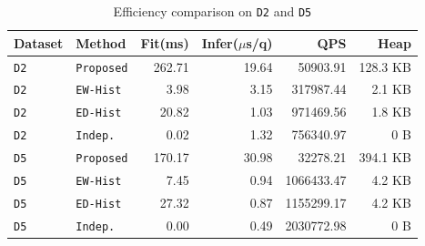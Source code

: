 \begin{table}[htbp]
    \centering
    \caption{Efficiency comparison on \texttt{D2} and \texttt{D5}}
    \label{tab:efficiency_comparison}
    \small
    \setlength{\tabcolsep}{3pt}
    \begin{tabular}{@{}llrrrr@{}}
        \toprule
        Dataset & Method & Fit(ms) & Infer($\mu$s/q) & QPS & Heap \\
        \midrule
        \texttt{D2} & \texttt{Proposed} & 262.71 & 19.64 & 50903.91 & 128.3 KB \\
        \texttt{D2} & \texttt{EW-Hist} & 3.98 & 3.15 & 317987.44 & 2.1 KB \\
        \texttt{D2} & \texttt{ED-Hist} & 20.82 & 1.03 & 971469.56 & 1.8 KB \\
        \texttt{D2} & \texttt{Indep.} & 0.02 & 1.32 & 756340.97 & 0 B \\
        \midrule
        \texttt{D5} & \texttt{Proposed} & 170.17 & 30.98 & 32278.21 & 394.1 KB \\
        \texttt{D5} & \texttt{EW-Hist} & 7.45 & 0.94 & 1066433.47 & 4.2 KB \\
        \texttt{D5} & \texttt{ED-Hist} & 27.32 & 0.87 & 1155299.17 & 4.2 KB \\
        \texttt{D5} & \texttt{Indep.} & 0.00 & 0.49 & 2030772.98 & 0 B \\
        \bottomrule
    \end{tabular}
\end{table}
